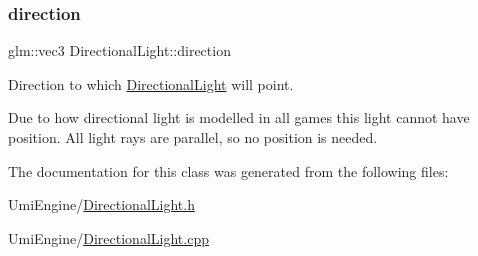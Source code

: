 \subsubsection{\texorpdfstring{direction}{direction}}
{\footnotesize\ttfamily glm\+::vec3 Directional\+Light\+::direction}



Direction to which \mbox{\hyperlink{class_directional_light}{Directional\+Light}} will point. 

Due to how directional light is modelled in all games this light cannot have position. All light rays are parallel, so no position is needed. 

The documentation for this class was generated from the following files\+:\begin{DoxyCompactItemize}
\item 
Umi\+Engine/\mbox{\hyperlink{_directional_light_8h}{Directional\+Light.\+h}}\item 
Umi\+Engine/\mbox{\hyperlink{_directional_light_8cpp}{Directional\+Light.\+cpp}}\end{DoxyCompactItemize}
